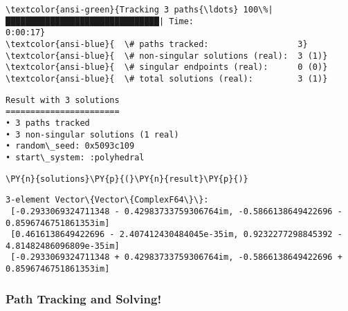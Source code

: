 \documentclass[11pt]{article}
\begin{document}
    \begin{Verbatim}[commandchars=\\\{\}]
\textcolor{ansi-green}{Tracking 3 paths{\ldots} 100\%|███████████████████████████████| Time:
0:00:17}
\textcolor{ansi-blue}{  \# paths tracked:                  3}
\textcolor{ansi-blue}{  \# non-singular solutions (real):  3 (1)}
\textcolor{ansi-blue}{  \# singular endpoints (real):      0 (0)}
\textcolor{ansi-blue}{  \# total solutions (real):         3 (1)}
    \end{Verbatim}

            \begin{tcolorbox}[breakable, size=fbox, boxrule=.5pt, pad at break*=1mm, opacityfill=0]
\begin{Verbatim}[commandchars=\\\{\}]
Result with 3 solutions
=======================
• 3 paths tracked
• 3 non-singular solutions (1 real)
• random\_seed: 0x5093c109
• start\_system: :polyhedral

\end{Verbatim}
\end{tcolorbox}
        
    \begin{tcolorbox}[breakable, size=fbox, boxrule=1pt, pad at break*=1mm,colback=cellbackground, colframe=cellborder]
\begin{Verbatim}[commandchars=\\\{\}]
\PY{n}{solutions}\PY{p}{(}\PY{n}{result}\PY{p}{)}
\end{Verbatim}
\end{tcolorbox}

            \begin{tcolorbox}[breakable, size=fbox, boxrule=.5pt, pad at break*=1mm, opacityfill=0]
\begin{Verbatim}[commandchars=\\\{\}]
3-element Vector\{Vector\{ComplexF64\}\}:
 [-0.2933069324711348 - 0.42983733759306764im, -0.5866138649422696 -
0.8596746751861353im]
 [0.4616138649422696 - 2.407412430484045e-35im, 0.9232277298845392 -
4.81482486096809e-35im]
 [-0.2933069324711348 + 0.42983733759306764im, -0.5866138649422696 +
0.8596746751861353im]
\end{Verbatim}
\end{tcolorbox}
        
    \hypertarget{path-tracking-and-solving}{%
\subsubsection{Path Tracking and
Solving!}\label{path-tracking-and-solving}}
\end{document}

